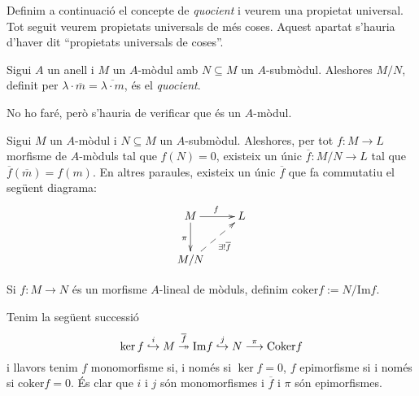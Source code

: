 \documentclass[../../../main.tex]{subfiles}
\begin{document}
Definim a continuació el concepte de \textit{quocient} i veurem una propietat universal. Tot seguit veurem propietats universals de més coses. Aquest apartat s'hauria d'haver dit ``propietats universals de coses''.

\begin{defi}
[Quocient]\label{def:quocientModuls} Sigui $A$ un anell i $M$ un $A$-mòdul amb $N\subseteq M$ un $A$-submòdul. Aleshores $M/N$, definit per $\lambda\cdotp\overline{m} = \overline{\lambda\cdotp m}$, és el \textit{quocient}.
\end{defi}

No ho faré, però s'hauria de verificar que és un $A$-mòdul. 

\begin{prop}
\label{prop:propietatUniversalQuocient} Sigui $M$ un $A$-mòdul i $N\subseteq M$ un $A$-submòdul. Aleshores, per tot $f:M\to L$ morfisme de $A$-mòduls tal que $f(N) = 0$, existeix un únic $\overline{f}:M/N\to L$ tal que $\overline{f}(\overline{m}) = f(m)$. En altres paraules, existeix un únic $\overline{f}$ que fa commutatiu el següent diagrama:
\begin{equation}
    \notag
    \xymatrix{
    M \ar[r]^f\ar[d]_\pi & L \\
    M/N \ar@{-->}[ur]_{\exists!\overline{f}}
    }
\end{equation}
\end{prop}

\begin{defi}
[Conúcli]\label{def:conucli} Si $f:M\to N$ és un morfisme $A$-lineal de mòduls, definim $\mathrm{coker}f := N/\mathrm{Im}f$.
\end{defi}

\begin{nota}
Tenim la següent successió
\begin{equation}
    \notag
    \ker f\overset{i}{\hookrightarrow} M\overset{\overline{f}}{\twoheadrightarrow}\mathrm{Im}f\overset{j}{\hookrightarrow} N \overset{\pi}{\longrightarrow}\mathrm{Coker}f
\end{equation}
i llavors tenim $f$ monomorfisme si, i només si $\ker f = 0$, $f$ epimorfisme si i només si $\mathrm{coker}f = 0$. És clar que $i$ i $j$ són monomorfismes i $\overline{f}$ i $\pi$ són epimorfismes. 
\end{nota}
\end{document}

